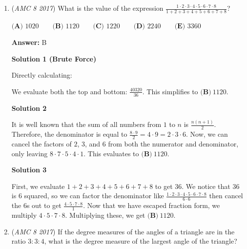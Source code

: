 \begin{enumerate}
 $\textbf{(A) }210\qquad\textbf{(B) }240\qquad\textbf{(C) }2100\qquad\textbf{(D) }2400\qquad\textbf{(E) }24000$

 \textbf{Answer: }D



\textbf{Solution}

We can approximate $7,928,564$ to $8,000,000$ and $0.000315$ to $0.0003.$ Multiplying the two yields $2400.$ Thus, it shows our answer is $\boxed{\textbf{(D)}\ 2400}.$



	\item (\textit{AMC 8 2017}) What is the value of the expression $\frac{1 \cdot 2 \cdot 3 \cdot 4 \cdot 5 \cdot 6 \cdot 7 \cdot 8}{1+2+3+4+5+6+7+8}$?


 $\textbf{(A) }1020\qquad\textbf{(B) }1120\qquad\textbf{(C) }1220\qquad\textbf{(D) }2240\qquad\textbf{(E) }3360$

 \textbf{Answer: }B



\textbf{Solution 1 (Brute Force)}

Directly calculating:

 We evaluate both the top and bottom: $\frac{40320}{36}$. This simplifies to $\boxed{\textbf{(B)}\ 1120}$.

 



\textbf{Solution 2}

It is well known that the sum of all numbers from $1$ to $n$ is $\frac{n(n+1)}{2}$. Therefore, the denominator is equal to $\frac{8 \cdot 9}{2} = 4 \cdot 9 = 2 \cdot 3 \cdot 6$. Now, we can cancel the factors of $2$, $3$, and $6$ from both the numerator and denominator, only leaving $8 \cdot 7 \cdot 5 \cdot 4 \cdot 1$. This evaluates to $\boxed{\textbf{(B)}\ 1120}$.

 



\textbf{Solution 3}

First, we evaluate $1 + 2 + 3 + 4 + 5 + 6 + 7 + 8$ to get 36. We notice that $36$ is $6$ squared, so we can factor the denominator like $\frac{1 \cdot 2 \cdot 3 \cdot 4 \cdot 5 \cdot 6 \cdot 7 \cdot 8}{6 \cdot 6}$ then cancel the 6s out to get $\frac{4 \cdot 5 \cdot 7 \cdot 8}{1}$. Now that we have escaped fraction form, we multiply $4 \cdot 5 \cdot 7 \cdot 8$. Multiplying these, we get $\boxed{\textbf{(B)}\ 1120}$.

 


	\item (\textit{AMC 8 2017}) If the degree measures of the angles of a triangle are in the ratio $3:3:4$, what is the degree measure of the largest angle of the triangle?



\end{enumerate}

